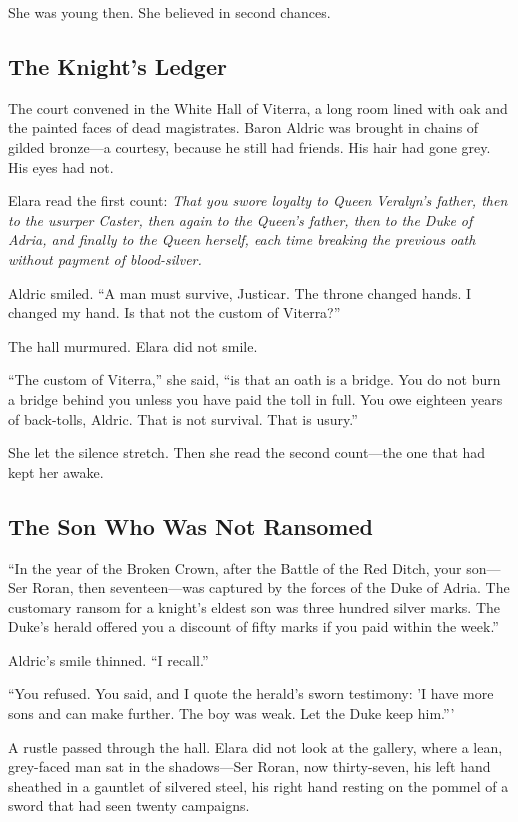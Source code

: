 \documentclass[11pt]{book}
\begin{document}
She was young then. She believed in second chances.

\subsection*{The Knight's Ledger}

The court convened in the White Hall of Viterra, a long room lined with oak and the painted faces of dead magistrates. Baron Aldric was brought in chains of gilded bronze---a courtesy, because he still had friends. His hair had gone grey. His eyes had not.

Elara read the first count: \textit{That you swore loyalty to Queen Veralyn's father, then to the usurper Caster, then again to the Queen's father, then to the Duke of Adria, and finally to the Queen herself, each time breaking the previous oath without payment of blood-silver.}

Aldric smiled. ``A man must survive, Justicar. The throne changed hands. I changed my hand. Is that not the custom of Viterra?''

The hall murmured. Elara did not smile.

``The custom of Viterra,'' she said, ``is that an oath is a bridge. You do not burn a bridge behind you unless you have paid the toll in full. You owe eighteen years of back-tolls, Aldric. That is not survival. That is usury.''

She let the silence stretch. Then she read the second count---the one that had kept her awake.

\subsection*{The Son Who Was Not Ransomed}

``In the year of the Broken Crown, after the Battle of the Red Ditch, your son---Ser Roran, then seventeen---was captured by the forces of the Duke of Adria. The customary ransom for a knight's eldest son was three hundred silver marks. The Duke's herald offered you a discount of fifty marks if you paid within the week.''

Aldric's smile thinned. ``I recall.''

``You refused. You said, and I quote the herald's sworn testimony: 'I have more sons and can make further. The boy was weak. Let the Duke keep him.'''

A rustle passed through the hall. Elara did not look at the gallery, where a lean, grey-faced man sat in the shadows---Ser Roran, now thirty-seven, his left hand sheathed in a gauntlet of silvered steel, his right hand resting on the pommel of a sword that had seen twenty campaigns.
\end{document}
